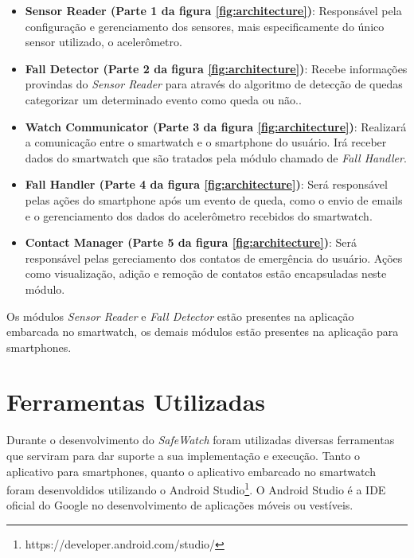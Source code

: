 \begin{itemize}
	\item{\textbf{Sensor Reader (Parte 1 da figura \ref{fig:architecture})}: Responsável pela configuração e gerenciamento dos sensores, mais especificamente do único sensor utilizado, o acelerômetro. }
	
	\item{\textbf{Fall Detector (Parte 2 da figura \ref{fig:architecture})}: Recebe informações provindas do \textit{Sensor Reader} para através do algoritmo de detecção de quedas categorizar um determinado evento como queda ou não.}.
	
	\item{\textbf{Watch Communicator (Parte 3 da figura \ref{fig:architecture})}: Realizará a comunicação entre o smartwatch e o smartphone do usuário. Irá receber dados do smartwatch que são tratados pela módulo chamado de \textit{Fall Handler}.}
	
	\item{\textbf{Fall Handler (Parte 4 da figura \ref{fig:architecture})}: Será responsável pelas ações do smartphone após um evento de queda, como o envio de emails e o gerenciamento dos dados do acelerômetro recebidos do smartwatch.}
	
	\item{\textbf{Contact Manager (Parte 5 da figura \ref{fig:architecture})}: Será responsável pelas gereciamento dos contatos de emergência do usuário. Ações como visualização, adição e remoção de contatos estão encapsuladas neste módulo.}
			
\end{itemize}

Os módulos \textit{Sensor Reader} e \textit{Fall Detector} estão presentes na aplicação embarcada no smartwatch, os demais módulos estão presentes na aplicação para smartphones. 

\section{Ferramentas Utilizadas}
\label{sec:tools}
Durante o desenvolvimento do \textit{SafeWatch} foram utilizadas diversas ferramentas que serviram para dar suporte a sua implementação e execução. Tanto o aplicativo para smartphones, quanto o aplicativo embarcado no smartwatch foram desenvoldidos utilizando o Android Studio\footnote{https://developer.android.com/studio/}. O Android Studio é a \ac{IDE} oficial do Google no desenvolvimento de aplicações móveis ou vestíveis. 


